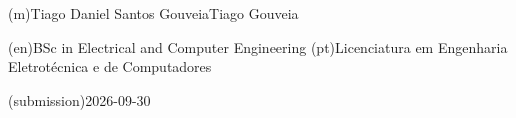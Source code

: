 %
%
\ntauthorname(m){Tiago Daniel Santos Gouveia}{Tiago Gouveia}



%
%
%
\ntauthordegree(en){BSc in Electrical and Computer Engineering}
\ntauthordegree(pt){Licenciatura em Engenharia Eletrotécnica e de Computadores}



%
%
%

%
%
\ntdate(submission){2026-09-30}



